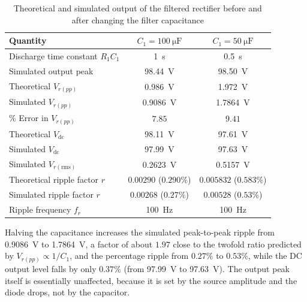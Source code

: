 \documentclass[12pt,a4paper]{article}
\begin{document}
	\begin{table}[H]
		\centering
		\caption{Theoretical and simulated output of the filtered rectifier before and after
			changing the filter capacitance}
		\label{tab:task4}
		\renewcommand{\arraystretch}{1.25}
		\begin{tabular}{|l|c|c|}
			\hline
			\textbf{Quantity} & \textbf{$C_1 = \SI{100}{\micro\farad}$} & \textbf{$C_1 = \SI{50}{\micro\farad}$} \\
			\hline
			Discharge time constant $R_1C_1$ & \SI{1}{\second} & \SI{0.5}{\second} \\
			\hline
			Simulated output peak & \SI{98.44}{\volt} & \SI{98.50}{\volt} \\
			\hline
			Theoretical $V_{r(pp)}$ & \SI{0.986}{\volt} & \SI{1.972}{\volt} \\
			\hline
			Simulated $V_{r(pp)}$ & \SI{0.9086}{\volt} & \SI{1.7864}{\volt} \\
			\hline
			\% Error in $V_{r(pp)}$ & $7.85$ & $9.41$ \\
			\hline
			Theoretical $V_{\mathrm{dc}}$ & \SI{98.11}{\volt} & \SI{97.61}{\volt} \\
			\hline
			Simulated $V_{\mathrm{dc}}$ & \SI{97.99}{\volt} & \SI{97.63}{\volt} \\
			\hline
			Simulated $V_{r(\mathrm{rms})}$ & \SI{0.2623}{\volt} & \SI{0.5157}{\volt} \\
			\hline
			Theoretical ripple factor $r$ & $0.00290$ ($0.290\%$) & $0.005832$ ($0.583\%$) \\
			\hline
			Simulated ripple factor $r$ & $0.00268$ ($0.27\%$) & $0.00528$ ($0.53\%$) \\
			\hline
			Ripple frequency $f_r$ & \SI{100}{\hertz} & \SI{100}{\hertz} \\
			\hline
		\end{tabular}
	\end{table}
	
	Halving the capacitance increases the simulated peak-to-peak ripple from \SI{0.9086}{\volt} to \SI{1.7864}{\volt}, a factor of about $1.97$ close to the twofold ratio predicted by $V_{r(pp)} \propto 1/C_1$, and the percentage ripple from $0.27\%$ to $0.53\%$, while the DC output level falls by only $0.37\%$ (from \SI{97.99}{\volt} to \SI{97.63}{\volt}). The output peak itself is essentially unaffected, because it is set by the source amplitude and the diode drops, not by the capacitor.
	
\end{document}

